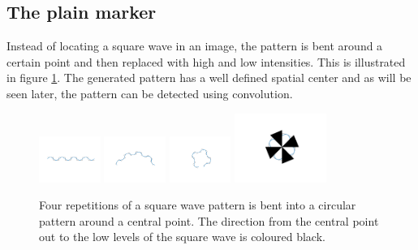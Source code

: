 \documentclass{article}
\begin{document}
\subsection{The plain marker} 
Instead of locating a square wave in an image, the pattern is bent around a certain point and then replaced with high and low intensities. 
This is illustrated in figure \ref{figBendingASquareWaveToACircularPattern}. 
The generated pattern has a well defined spatial center and as will be seen later, the pattern can be detected using convolution. 
\begin{figure} 
\includegraphics[width=2cm]{pic/markertrackerbendingstill1.png} 
\includegraphics[width=2cm]{pic/markertrackerbendingstill121.png} 
\includegraphics[width=2cm]{pic/markertrackerbendingstill241.png} 
\includegraphics[width=3cm]{pic/finalmarker.png} 
\caption{Four repetitions of a square wave pattern is bent into a circular pattern around a central point. 
The direction from the central point out to the low levels of the square wave is coloured black.} 
\label{figBendingASquareWaveToACircularPattern} 
\end{figure} 
\end{document}
